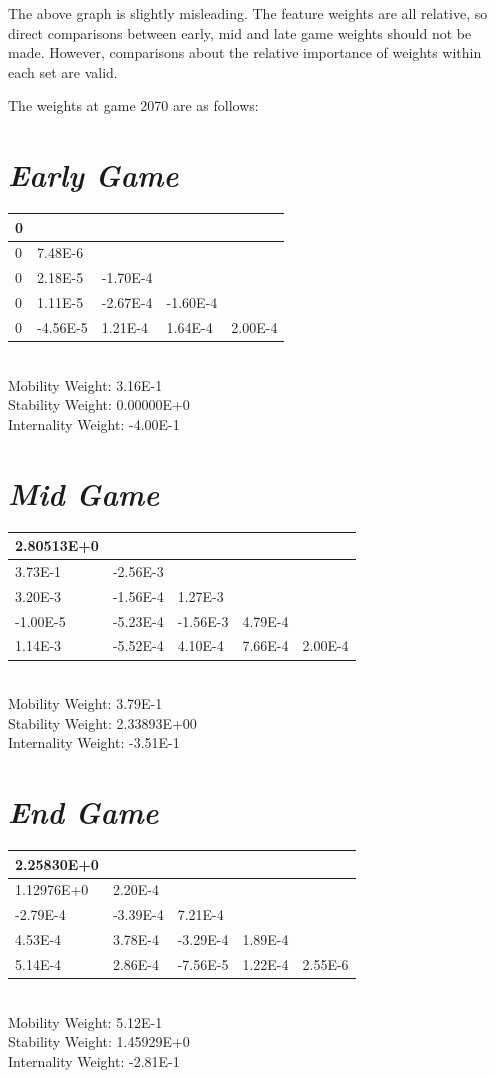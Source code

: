 \documentclass[10pt]{report}
\begin{document}
\begin{multicols}{2}
The above graph is slightly misleading. The feature weights are all relative, so direct comparisons between early, mid and late game weights should not be made. However, comparisons about the relative importance of weights within each set are valid.

The weights at game 2070 are as follows:
\section*{\emph{\textmd{Early Game}}}
\begin{tabular}{| l | l | l | l | l | }
\hline
 0&&&&\\
\hline
 0& 7.48E-6&&&\\
\hline
 0& 2.18E-5&-1.70E-4&&\\
\hline
 0& 1.11E-5&-2.67E-4&-1.60E-4&\\
\hline
 0&-4.56E-5& 1.21E-4& 1.64E-4& 2.00E-4\\
\hline
\end{tabular}
\medskip{}\\
Mobility Weight: 3.16E-1\\
Stability Weight: 0.00000E+0\\
Internality Weight: -4.00E-1
\section*{\emph{\textmd{Mid Game}}}
\begin{tabular}{| l | l | l | l | l | }
\hline
 2.80513E+0&&&&\\
\hline
 3.73E-1&-2.56E-3&&&\\
\hline
 3.20E-3&-1.56E-4& 1.27E-3&&\\
\hline
-1.00E-5&-5.23E-4&-1.56E-3& 4.79E-4&\\
\hline
 1.14E-3&-5.52E-4& 4.10E-4& 7.66E-4& 2.00E-4\\
\hline
\end{tabular}
\medskip{}\\
Mobility Weight: 3.79E-1\\
Stability Weight: 2.33893E+00\\
Internality Weight: -3.51E-1
\section*{\emph{\textmd{End Game}}}
\begin{tabular}{| l | l | l | l | l | }
\hline
 2.25830E+0&&&&\\
\hline
 1.12976E+0& 2.20E-4&&&\\
\hline
-2.79E-4&-3.39E-4& 7.21E-4&&\\
\hline
 4.53E-4& 3.78E-4&-3.29E-4& 1.89E-4&\\
\hline
 5.14E-4& 2.86E-4&-7.56E-5& 1.22E-4& 2.55E-6\\
\hline
\end{tabular}
\medskip{}\\
Mobility Weight: 5.12E-1\\
Stability Weight: 1.45929E+0\\
Internality Weight: -2.81E-1


\end{multicols}
\end{document}
